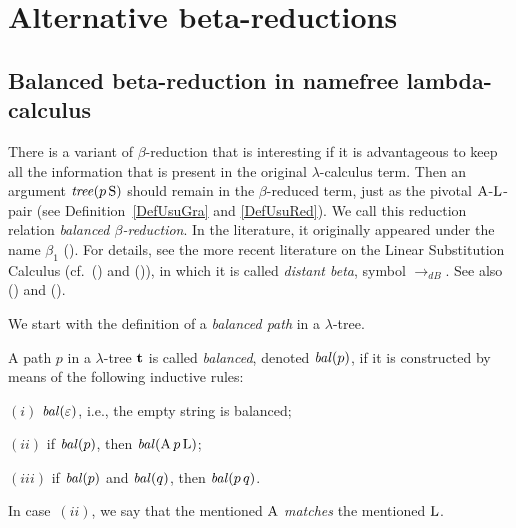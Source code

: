 \documentclass[submission,copyright,creativecommons]{eptcs}
\begin{document}


\section{Alternative beta-reductions}
\label{SecAlt}



\subsection{Balanced beta-reduction in namefree lambda-calculus}\label{SecBal}

There is a variant of $\beta$-reduction that is interesting if it is advantageous to keep all the information that is present in the original $\lambda$-calculus term. Then an argument ${\it tree}(p\, {\rm S})$ should remain in the $\beta$-reduced term, just as the pivotal ${\rm A}$-${\rm L}$-pair (see Definition~\ref{DefUsuGra} and \ref{DefUsuRed}). We  call this reduction relation {\em balanced $\beta$-reduction\/}. In the literature, it originally appeared under the name $\beta_1$ (\cite{Ned73}). For details, see the more recent literature on the Linear Substitution Calculus (cf.\ (\cite{AccKes}) and (\cite{AccKes12})), in which it is called {\em distant beta\/}, symbol  $\rightarrow_{dB}$. See also (\cite{BarBon}) and (\cite{KB05}).

\smallskip

We start with the definition of a {\em balanced path\/} in a $\lambda$-tree.

\begin{Def}\label{DefBalPat}
A path $p$ in a $\lambda$-tree ${\bf t}$ is called {\em balanced\/}, denoted ${\it bal}(p)$, if it is constructed by means of the following inductive rules:

$(i)$ ${\it bal}(\varepsilon)$, i.e., the empty string is balanced;

$(ii)$ if ${\it bal}(p)$, then ${\it bal}({\rm A} \, p \, {\rm L})$;

$(iii)$ if ${\it bal}(p)$ and ${\it bal}(q)$, then ${\it bal}(p \, q)$.

\noindent In case~$(ii)$, we say that the mentioned ${\rm A}$ {\it matches\/} the mentioned ${{\rm L}}$.
\end{Def}
\end{document}
